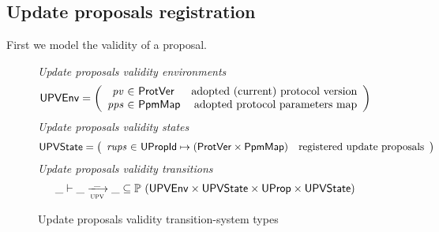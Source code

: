 \subsection{Update proposals registration}
\label{sec:update-proposals-registration}

First we model the validity of a proposal.

\begin{figure}[htb]
  \emph{Update proposals validity environments}
  \begin{equation*}
    \UPVEnv =
    \left(
      \begin{array}{r@{~\in~}lr}
        \var{pv} & \ProtVer & \text{adopted (current) protocol version}\\
        \var{pps} & \PPMMap & \text{adopted protocol parameters map}\\
      \end{array}
    \right)
  \end{equation*}
  \emph{Update proposals validity states}
  \begin{equation*}
    \UPVState
    = \left(
      \begin{array}{r@{~\in~}lr}
        \var{rups} & \UPropId \mapsto (\ProtVer \times \PPMMap)
        & \text{registered update proposals}\\
      \end{array}
    \right)
  \end{equation*}
  \emph{Update proposals validity transitions}
    \begin{equation*}
    \var{\_} \vdash
    \var{\_} \trans{upv}{\_} \var{\_}
    \subseteq \powerset (\UPVEnv \times \UPVState \times \UProp \times \UPVState)
  \end{equation*}
  \caption{Update proposals validity transition-system types}
  \label{fig:ts-types:up-validity}
\end{figure}

